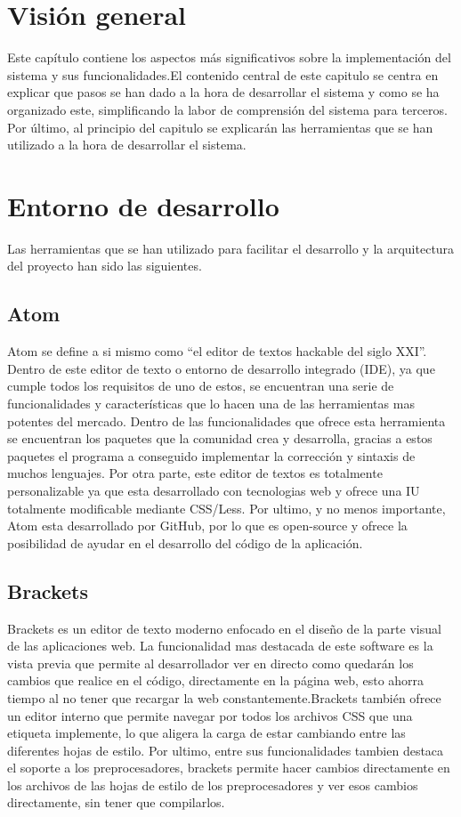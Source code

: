\section{Visión general}
Este capítulo contiene los aspectos más significativos sobre la implementación del sistema y sus funcionalidades.El contenido central de este capitulo se centra en explicar que pasos se han dado a la hora de desarrollar el sistema y como se ha organizado este, simplificando la labor de comprensión del sistema para terceros. Por último, al principio del capitulo se explicarán las herramientas que se han utilizado a la hora de desarrollar el sistema. 
\section{Entorno de desarrollo}
Las herramientas que se han utilizado para facilitar el desarrollo y la arquitectura del proyecto han sido las siguientes.

\subsection{Atom}
Atom se define a si mismo como ``el editor de textos hackable del siglo XXI''. Dentro de este editor de texto o entorno de desarrollo integrado (IDE), ya que cumple todos los requisitos de uno de estos, se encuentran una serie de funcionalidades y características que lo hacen una de las herramientas mas potentes del mercado. Dentro de las funcionalidades que ofrece esta herramienta se encuentran los paquetes que la comunidad crea y desarrolla, gracias a estos paquetes el programa a conseguido implementar la corrección y sintaxis de muchos lenguajes. Por otra parte, este editor de textos es totalmente personalizable ya que esta desarrollado con tecnologias web y ofrece una IU totalmente modificable mediante CSS/Less. Por ultimo, y no menos importante, Atom esta desarrollado por GitHub, por lo que es open-source y ofrece la posibilidad de ayudar en el desarrollo del código de la aplicación.

\subsection{Brackets}
Brackets es un editor de texto moderno enfocado en el diseño de la parte visual de las aplicaciones web. La funcionalidad mas destacada de este software es la vista previa que permite al desarrollador ver en directo como quedarán los cambios que realice en el código, directamente en la página web, esto ahorra tiempo al no tener que recargar la web constantemente.Brackets también ofrece un editor interno que permite navegar por todos los archivos CSS que una etiqueta implemente, lo que aligera la carga de estar cambiando entre las diferentes hojas de estilo. Por ultimo, entre sus funcionalidades tambien destaca el soporte a los preprocesadores, brackets permite hacer cambios directamente en los archivos de las hojas de estilo de los preprocesadores y ver esos cambios directamente, sin tener que compilarlos.

